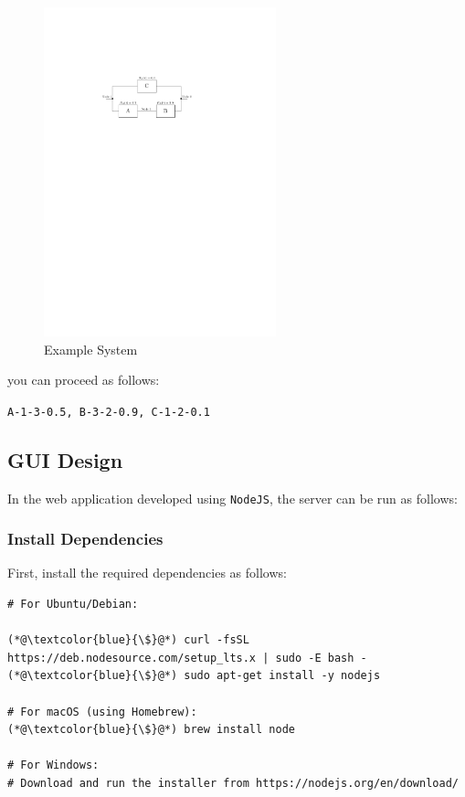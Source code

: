\documentclass[12pt	]{article}
\begin{document}
\begin{figure}[h]
	\centering
	\includegraphics[width=0.6\textwidth]{Images/img1.pdf}
	\caption{Example System}
	\label{fig:Example System}
\end{figure}


you can proceed as follows:

\begin{center}
	\texttt{A-1-3-0.5, B-3-2-0.9, C-1-2-0.1}
\end{center}





\subsection{GUI Design}
In the web application developed using \texttt{NodeJS}, the server can be run as follows:

\subsubsection{Install Dependencies}
First, install the required dependencies as follows:


\begin{lstlisting}
# For Ubuntu/Debian:

(*@\textcolor{blue}{\$}@*) curl -fsSL https://deb.nodesource.com/setup_lts.x | sudo -E bash -
(*@\textcolor{blue}{\$}@*) sudo apt-get install -y nodejs

# For macOS (using Homebrew):
(*@\textcolor{blue}{\$}@*) brew install node

# For Windows:
# Download and run the installer from https://nodejs.org/en/download/
\end{lstlisting}
\end{document}
